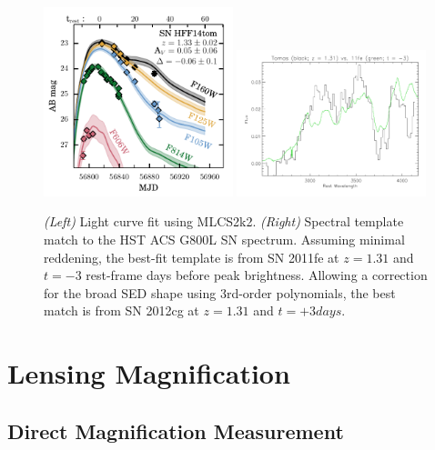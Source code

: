 \begin{figure}
\begin{center}
\includegraphics[width=0.49\textwidth]{FIG/lcfit_mlcs2k2_ABmag}
\includegraphics[width=0.49\textwidth]{FIG/specfit_11fe_t-3_z131}
\caption{ {\it (Left)} Light curve fit using MLCS2k2. 
{\it (Right)} Spectral template match to the HST ACS G800L SN
spectrum.  Assuming minimal reddening, the best-fit template is from
SN 2011fe at $z=1.31$ and $t=-3$ rest-frame days before peak
brightness.  Allowing a correction for the broad SED shape using
3rd-order polynomials, the best match is from SN 2012cg at $z=1.31$
and $t=+3 days$.
\label{fig:mlcsfit} }
\end{center}
\end{figure}

\section{Lensing Magnification}
\label{sec:LensingMagnification}


\subsection{Direct Magnification Measurement}
\label{sec:DirectMagnificationMeasurement}


